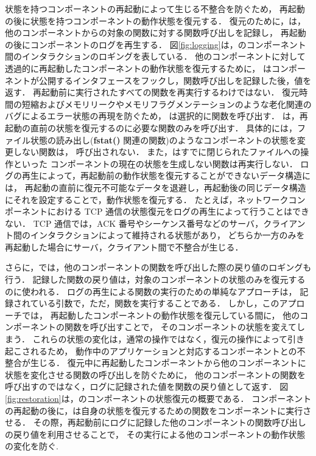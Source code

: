状態を持つコンポーネントの再起動によって生じる不整合を防ぐため，
再起動の後に状態を持つコンポーネントの動作状態を復元する．
復元のために，\sysname は，他のコンポーネントからの対象の関数に対する関数呼び出しを記録し，
再起動の後にコンポーネントのログを再生する．
図\ref{fig:logging}は，\sysname のコンポーネント間のインタラクションのロギングを表している．
他のコンポーネントに対して透過的に再起動したコンポーネントの動作状態を復元するために，
{\sysname} はコンポーネントが公開するインタフェースをフックし，関数呼び出しを記録した後，値を返す．
再起動前に実行されたすべての関数を再実行するわけではない．
復元時間の短縮およびメモリリークやメモリフラグメンテーションのような老化関連のバグによるエラー状態の再現を防ぐため，
\sysname は選択的に関数を呼び出す．
\sysname は，再起動の直前の状態を復元するのに必要な関数のみを呼び出す．
具体的には，ファイル状態の読み出し(\textbf{fstat()} 関連の関数)のようなコンポーネントの状態を変更しない関数は，
呼び出されない．
また，\sysname はすでに閉じられたファイルへの操作といった
コンポーネントの現在の状態を生成しない関数は再実行しない．
ログの再生によって，再起動前の動作状態を復元することができないデータ構造には，
再起動の直前に復元不可能なデータを退避し，再起動後の同じデータ構造にそれを設定することで，動作状態を復元する．
たとえば，ネットワークコンポーネントにおける TCP 通信の状態復元をログの再生によって行うことはできない．
TCP 通信では，ACK 番号やシーケンス番号などのサーバ，クライアント間のインタラクションによって維持される状態があり，
どちらか一方のみを再起動した場合にサーバ，クライアント間で不整合が生じる．


さらに，\sysname では，他のコンポーネントの関数を呼び出した際の戻り値のロギングも行う．
記録した関数の戻り値は，対象のコンポーネントの状態のみを復元するのに使われる．
ログの再生による関数の実行のための単純なアプローチは，
記録されている引数で，ただ，関数を実行することである．
しかし，このアプローチでは，
再起動したコンポーネントの動作状態を復元している間に，
他のコンポーネントの関数を呼び出すことで，
そのコンポーネントの状態を変えてしまう．
これらの状態の変化は，通常の操作ではなく，復元の操作によって引き起こされるため，
動作中のアプリケーションと対応するコンポーネントとの不整合が生じる．
復元中に再起動したコンポーネントから他のコンポーネントに状態を変化させる関数の呼び出しを防ぐために，
他のコンポーネントの関数を呼び出すのではなく，ログに記録された値を関数の戻り値として返す．
図\ref{fig:restoration}は，\sysname のコンポーネントの状態復元の概要である．
コンポーネントの再起動の後に，\sysname は自身の状態を復元するための関数をコンポーネントに実行させる．
その際，再起動前にログに記録した他のコンポーネントの関数呼び出しの戻り値を利用させることで，
その実行による他のコンポーネントの動作状態の変化を防ぐ.



